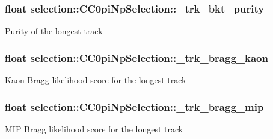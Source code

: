 \subsubsection[{\texorpdfstring{\+\_\+trk\+\_\+bkt\+\_\+purity}{_trk_bkt_purity}}]{\setlength{\rightskip}{0pt plus 5cm}float selection\+::\+C\+C0pi\+Np\+Selection\+::\+\_\+trk\+\_\+bkt\+\_\+purity\hspace{0.3cm}{\ttfamily [private]}}\hypertarget{classselection_1_1CC0piNpSelection_a39a84b873306f200a2350b4804429791}{}\label{classselection_1_1CC0piNpSelection_a39a84b873306f200a2350b4804429791}
Purity of the longest track 
\subsubsection[{\texorpdfstring{\+\_\+trk\+\_\+bragg\+\_\+kaon}{_trk_bragg_kaon}}]{\setlength{\rightskip}{0pt plus 5cm}float selection\+::\+C\+C0pi\+Np\+Selection\+::\+\_\+trk\+\_\+bragg\+\_\+kaon\hspace{0.3cm}{\ttfamily [private]}}\hypertarget{classselection_1_1CC0piNpSelection_ac9b23583581239191762cfb60307fb78}{}\label{classselection_1_1CC0piNpSelection_ac9b23583581239191762cfb60307fb78}
Kaon Bragg likelihood score for the longest track 
\subsubsection[{\texorpdfstring{\+\_\+trk\+\_\+bragg\+\_\+mip}{_trk_bragg_mip}}]{\setlength{\rightskip}{0pt plus 5cm}float selection\+::\+C\+C0pi\+Np\+Selection\+::\+\_\+trk\+\_\+bragg\+\_\+mip\hspace{0.3cm}{\ttfamily [private]}}\hypertarget{classselection_1_1CC0piNpSelection_aec1e4d27216773ec40bc66ab5c217abc}{}\label{classselection_1_1CC0piNpSelection_aec1e4d27216773ec40bc66ab5c217abc}
M\+IP Bragg likelihood score for the longest track 
